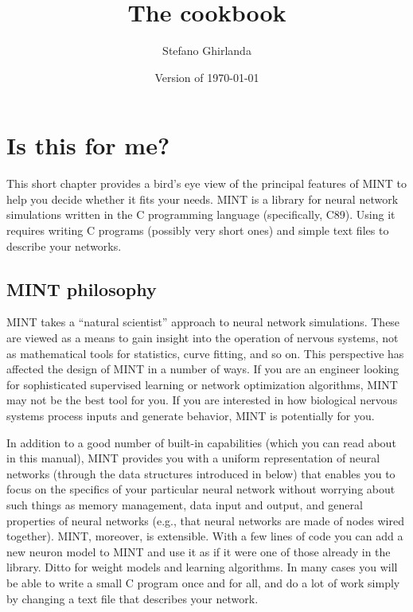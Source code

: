 \documentclass[12pt,letterpaper]{memoir}
\title{\bfseries The \mint cookbook}
\author{Stefano Ghirlanda}
\date{\footnotesize Version \mintversion of \today}
\let\fref\relax%
\newcommand{\mint}{MINT\xspace}
\begin{document}
\pagestyle{plain}

\maketitle

\clearpage

\tableofcontents

\renewcommand{\foottextfont}{\sffamily\footnotesize}

\renewcommand{\thepage}{\sffamily\arabic{page}}

\clearpage

\chapter{Is this for me?}
\label{chap:intro}

This short chapter provides a bird's eye view of the principal
features of \mint to help you decide whether it fits your needs.
\mint is a library for neural network simulations written in the C
programming language (specifically, C89). Using it requires writing C
programs (possibly very short ones) and simple text files to describe
your networks.

\section{\mint philosophy}
\label{sec:mint-philosophy}

\mint takes a ``natural scientist'' approach to neural network
simulations. These are viewed as a means to gain insight into the
operation of nervous systems, not as mathematical tools for
statistics, curve fitting, and so on. This perspective has affected
the design of \mint in a number of ways. If you are an engineer
looking for sophisticated supervised learning or network optimization
algorithms, \mint may not be the best tool for you.  If you are
interested in how biological nervous systems process inputs and
generate behavior, \mint is potentially for you.

In addition to a good number of built-in capabilities (which you can
read about in this manual), \mint provides you with a uniform
representation of neural networks (through the data structures
introduced in \fref{sec:the-very-basics} below) that enables you to
focus on the specifics of your particular neural network without
worrying about such things as memory management, data input and
output, and general properties of neural networks (e.g., that neural
networks are made of nodes wired together).  \mint, moreover, is
extensible.  With a few lines of code you can add a new neuron model
to \mint and use it as if it were one of those already in the
library. Ditto for weight models and learning algorithms. In many
cases you will be able to write a small C program once and for all,
and do a lot of work simply by changing a text file that describes
your network.
\end{document}
